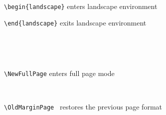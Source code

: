 \documentclass[twoside,8pt]{extarticle}
\begin{document}
~

{\normalsize
\noindent\verb"\begin{landscape}" enters landscape environment}
 \begin{landscape}
 \lipsum[2-5]
 \end{landscape}
{\normalsize
\noindent\verb"\end{landscape}" exits landscape environment}

~

 \marginpar[{\itshape\tiny\lipsum[1][1-4]}]{\itshape\tiny\lipsum[1][1-3]}  \lipsum[17]

~

{\normalsize
\noindent\verb"\NewFullPage" enters full page mode}
\NewFullPage

         \lipsum[1-4]

~

{\normalsize
\noindent\verb"\OldMarginPage " restores the previous page format}
\OldMarginPage

 \marginpar[{\itshape\tiny\lipsum[1][1-4]}]{\itshape\tiny\lipsum[1][1-3]}  \lipsum[17]
\end{document}
